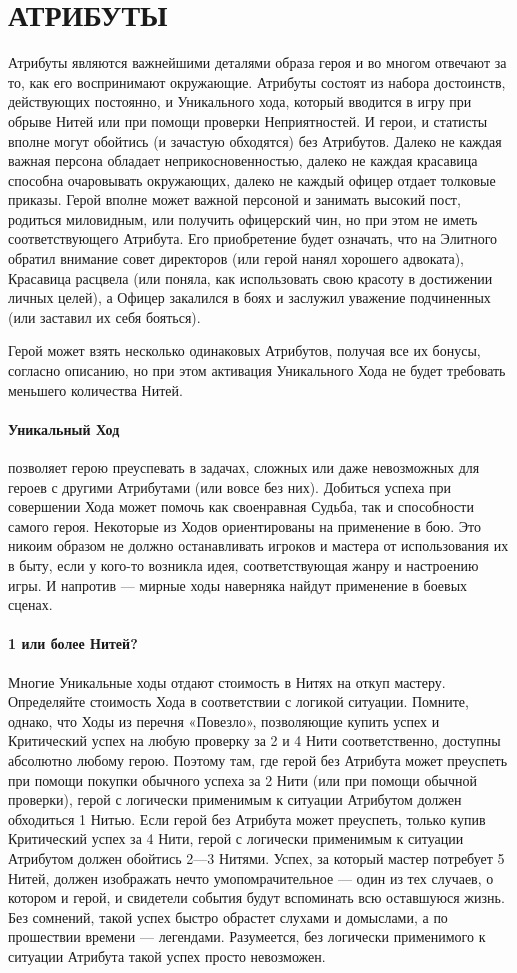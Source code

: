 \section{АТРИБУТЫ}
Атрибуты являются важнейшими деталями образа героя и во многом отвечают за то, как его воспринимают окружающие. Атрибуты состоят из набора достоинств, действующих постоянно, и Уникального хода, который вводится в игру при обрыве Нитей или при помощи проверки Неприятностей.
И герои, и статисты вполне могут обойтись (и зачастую обходятся) без Атрибутов. Далеко не каждая важная персона обладает неприкосновенностью, далеко не каждая красавица способна очаровывать окружающих, далеко не каждый офицер отдает толковые приказы. Герой вполне может важной персоной и занимать высокий пост, родиться миловидным, или получить офицерский чин, но при этом не иметь соответствующего Атрибута. Его приобретение будет означать, что на Элитного обратил внимание совет директоров (или герой нанял хорошего адвоката), Красавица расцвела (или поняла, как использовать свою красоту в достижении личных целей), а Офицер закалился в боях и заслужил уважение подчиненных (или заставил их себя бояться).
\begin{tcolorbox}
Герой может взять несколько одинаковых Атрибутов, получая все их бонусы, согласно описанию, но при этом активация Уникального Хода не будет требовать меньшего количества Нитей.
\end{tcolorbox}
\paragraph{Уникальный Ход} позволяет герою преуспевать в задачах, сложных или даже невозможных для героев с другими Атрибутами (или вовсе без них). Добиться успеха при совершении Хода может помочь как своенравная Судьба, так и способности самого героя. Некоторые из Ходов ориентированы на применение в бою. Это никоим образом не должно останавливать игроков и мастера от использования их в быту, если у кого-то возникла идея, соответствующая жанру и настроению игры. И напротив — мирные ходы наверняка найдут применение в боевых сценах.
\paragraph{1 или более Нитей?} Многие Уникальные ходы отдают стоимость в Нитях на откуп мастеру. Определяйте стоимость Хода в соответствии с логикой ситуации. Помните, однако, что Ходы из перечня «Повезло», позволяющие купить успех и Критический успех на любую проверку за 2 и 4 Нити соответственно, доступны абсолютно любому герою. Поэтому там, где герой без Атрибута может преуспеть при помощи покупки обычного успеха за 2 Нити (или при помощи обычной проверки), герой с логически применимым к ситуации Атрибутом должен обходиться 1 Нитью. Если герой без Атрибута может преуспеть, только купив Критический успех за 4 Нити, герой с логически применимым к ситуации Атрибутом должен обойтись 2—3 Нитями. Успех, за который мастер потребует 5 Нитей, должен изображать нечто умопомрачительное — один из тех случаев, о котором и герой, и свидетели события будут вспоминать всю оставшуюся жизнь. Без сомнений, такой успех быстро обрастет слухами и домыслами, а по прошествии времени — легендами. Разумеется, без логически применимого к ситуации Атрибута такой успех просто невозможен.

